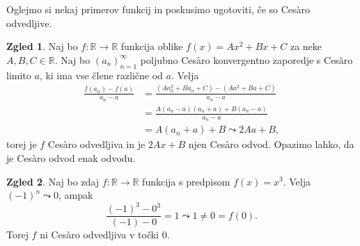 \documentclass[a4paper,12pt]{article}
\theoremstyle{definition}
\newtheorem{zgled}{Zgled}
\theoremstyle{plain}
\begin{document}
Oglejmo si nekaj primerov funkcij in poskusimo ugotoviti, če so Ces\`{a}ro odvedljive.

\begin{zgled}
    \label{vseodv}
    Naj bo $f: \mathbb{R} \rightarrow \mathbb{R}$ funkcija oblike $f(x) = Ax^2 + Bx + C$ za neke $A, B, C \in \mathbb{R}$. Naj bo $(a_n)_{n=1}^{\infty}$ poljubno Ces\`{a}ro konvergentno zaporedje s Ces\`{a}ro limito $a$, ki ima vse člene različne od $a$. Velja 
    \begin{align*}
        \frac{f(a_n)-f(a)}{a_n-a} &= \frac{(Aa_n^2 + Ba_n + C)-(Aa^2 + Ba + C)}{a_n-a}\\
        &= \frac{A(a_n-a)(a_n+a) + B(a_n-a)}{a_n-a}\\
        &= A(a_n+a) + B \leadsto 2Aa + B,
    \end{align*}
    torej je $f$ Ces\`{a}ro odvedljiva in je $2Ax + B$ njen Ces\`{a}ro odvod. Opazimo lahko, da je Ces\`{a}ro odvod enak odvodu.
\end{zgled}

\begin{zgled}
    Naj bo zdaj $f: \mathbb{R} \rightarrow \mathbb{R}$ funkcija s predpisom $f(x) = x^3$. Velja $(-1)^n \leadsto 0$, ampak 
    $$\frac{(-1)^3-0^3}{(-1)-0} = 1 \leadsto 1 \neq 0 = f(0).$$ 
    Torej $f$ ni Ces\`{a}ro odvedljiva v točki 0.
\end{zgled}
\end{document}
